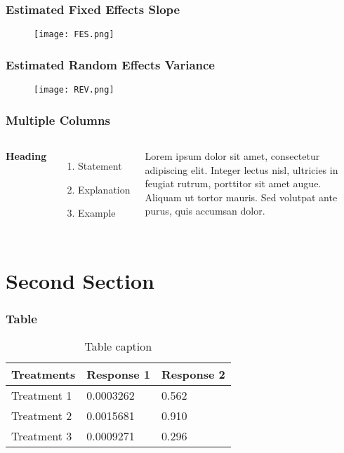 \documentclass{beamer}
\begin{document}
\begin{frame}
\frametitle{Estimated Fixed Effects Slope}

\begin{figure}
	
	\texttt{[image: FES.png]}
	
\end{figure}

\end{frame}
\begin{frame}
\frametitle{Estimated Random Effects Variance}
\begin{figure}
	
	\texttt{[image: REV.png]}
	
\end{figure}

\end{frame}
\begin{frame}
\frametitle{Multiple Columns}
\begin{columns}[c] %

\textbf{Heading}
\begin{enumerate}
\item Statement
\item Explanation
\item Example
\end{enumerate}

Lorem ipsum dolor sit amet, consectetur adipiscing elit. Integer lectus nisl, ultricies in feugiat rutrum, porttitor sit amet augue. Aliquam ut tortor mauris. Sed volutpat ante purus, quis accumsan dolor.

\end{columns}
\end{frame}

\section{Second Section}

\begin{frame}
\frametitle{Table}
\begin{table}
\begin{tabular}{l l l}
\toprule
\textbf{Treatments} & \textbf{Response 1} & \textbf{Response 2}\\
\midrule
Treatment 1 & 0.0003262 & 0.562 \\
Treatment 2 & 0.0015681 & 0.910 \\
Treatment 3 & 0.0009271 & 0.296 \\
\bottomrule
\end{tabular}
\caption{Table caption}
\end{table}
\end{frame}
\end{document}
